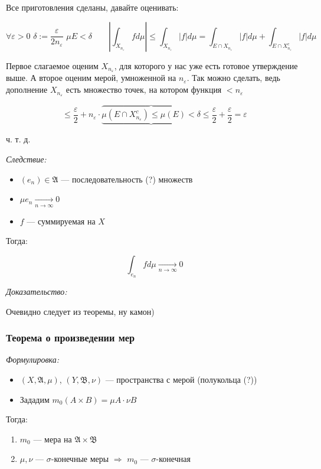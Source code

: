 \documentclass{article}
\def\dbl{\,\,}
\def\goesto#1{\underset{#1}{\longrightarrow}}
\def\toinf#1{\goesto{#1 \rightarrow \infty}}
\def\ntoinf{\toinf{n}}
\begin{document}
Все приготовления сделаны, давайте оценивать:

\[\forall \varepsilon > 0 \dbl \delta := \frac{\varepsilon}{2 n_{\varepsilon}} \dbl \mu E < \delta \qquad \left|\int_{X_{n_\varepsilon}} f d\mu\right| \le \int_{X_{n_\varepsilon}} |f| d\mu = \int_{E \cap X_{n_\varepsilon}} |f| d\mu + \int_{E \cap X^c_{n_{\varepsilon}}} |f| d\mu\]

Первое слагаемое оценим $X_{n_{\varepsilon}}$, для которого у нас уже есть готовое утверждение выше. А второе оценим мерой, умноженной на $n_\varepsilon$. Так можно сделать, ведь дополнение $X_{n_\varepsilon}$ есть множество точек, на котором функция $< n_{\varepsilon}$

\[\le \frac{\varepsilon}{2} + n_{\varepsilon} \cdot \overbrace{\underbrace{\mu \left( E \cap X^c_{n_{\varepsilon}}\right) \le \mu\left( E \right) < \delta}} \le \frac{\varepsilon}{2} + \frac{\varepsilon}{2} = \varepsilon\]

ч. т. д. 

\textit{Следствие:}
\begin{itemize}
    \item $(e_n) \in \mathfrak{A}$ --- последовательность (?) множеств\
    \item $\mu e_n \ntoinf 0$
    \item $f$ --- суммируемая на $X$
\end{itemize}

Тогда:

\[\int_{e_n} f d \mu \ntoinf 0\]

\textit{Доказательство:}


Очевидно следует из теоремы, ну камон)

\subsubsection{Теорема о произведении мер}
\textit{Формулировка:}

\begin{itemize}
    \item $(X, \mathfrak{A}, \mu)$, $(Y, \mathfrak{B}, \nu)$ --- пространства с мерой (полукольца (?))
    \item Зададим $m_0(A \times B) = \mu A \cdot \nu B$
\end{itemize}

Тогда:

\begin{enumerate}
    \item $m_0$ --- мера на $\mathfrak{A} \times \mathfrak{B}$
    \item $\mu, \nu$ --- $\sigma$-конечные меры $\Longrightarrow$ $m_0$ --- $\sigma$-конечная
\end{enumerate}
\end{document}
